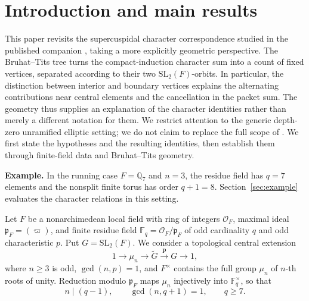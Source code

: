 \documentclass[12pt, letterpaper]{article}
\numberwithin{equation}{section}
\theoremstyle{definition}
\theoremstyle{remark}
\newcommand{\OO}{\mathcal{O}_F}
\newcommand{\kk}{\mathbb{F}_q}
\newcommand{\G}{\mathrm{SL}_2(F)}
\newcommand{\wtG}{\widetilde{G}}
\begin{document}
\tableofcontents

\section{Introduction and main results}\label{sec:intro}

This paper revisits the supercuspidal character correspondence studied in the published companion \cite{Jo99}, taking a more explicitly geometric perspective. The Bruhat--Tits tree turns the compact-induction character sum into a count of fixed vertices, separated according to their two $\mathrm{SL}_2(F)$-orbits. In particular, the distinction between interior and boundary vertices explains the alternating contributions near central elements and the cancellation in the packet sum. The geometry thus supplies an explanation of the character identities rather than merely a different notation for them. We restrict attention to the generic depth-zero unramified elliptic setting; we do not claim to replace the full scope of \cite{Jo99}. We first state the hypotheses and the resulting identities, then establish them through finite-field data and Bruhat--Tits geometry.

\noindent\textbf{Example.} In the running case $F=\mathbb{Q}_7$ and $n=3$, the residue field has $q=7$ elements and the nonsplit finite torus has order $q+1=8$. Section~\ref{sec:example} evaluates the character relations in this setting.

Let $F$ be a nonarchimedean local field with ring of integers $\OO$, maximal ideal $\mathfrak{p}_F=(\varpi)$, and finite residue field $\kk=\OO/\mathfrak{p}_F$ of odd cardinality $q$ and odd characteristic $p$. Put $G=\G$. We consider a topological central extension
\begin{equation}\label{eq:cover}
 1\longrightarrow\mu_n\longrightarrow\wtG
 \xrightarrow{\,\mathbf{p}\,}G\longrightarrow 1,
\end{equation}
where $n\ge 3$ is odd, $\gcd(n,p)=1$, and $F^\times$ contains the full group $\mu_n$ of $n$-th roots of unity. Reduction modulo $\mathfrak{p}_F$ maps $\mu_n$ injectively into $\kk^\times$, so that
\begin{equation}\label{eq:coprime}
 n\mid (q-1),\qquad \gcd(n,q+1)=1,\qquad q\ge 7.
\end{equation}
\end{document}
